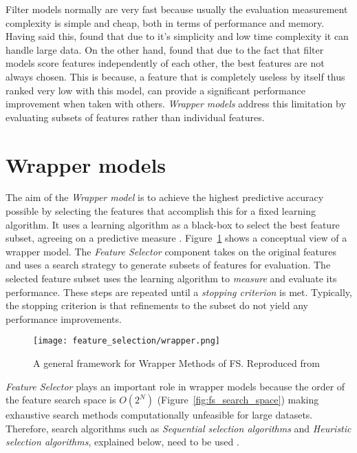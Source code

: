Filter models normally are very fast because usually the evaluation measurement complexity is simple and cheap, both in terms of performance and memory. Having said this, \citet{garcia2015data} found that due to it's simplicity and low time complexity it can handle large data. On the other hand, \citet{guyon2003introduction} found that due to the fact that filter models score features independently of each other, the best features are not always chosen. This is because, a feature that is completely useless by itself thus ranked very low with this model, can provide a significant performance improvement when taken with others. \textit{Wrapper models} address this limitation by evaluating subsets of features rather than individual features.

\section{Wrapper models}\label{sec:fs_wrapper}
The aim of the \textit{Wrapper model} is to achieve the highest predictive accuracy possible by selecting the features that accomplish this for a fixed learning algorithm. It uses a learning algorithm as a black-box to select the best feature subset, agreeing on a predictive measure \citep{kohavi1995study}. Figure~\ref{fig:fs_wrapper} shows a conceptual view of a wrapper model. The \textit{Feature Selector} component takes on the original features and uses a search strategy to generate subsets of features for evaluation. The selected feature subset uses the learning algorithm to \textit{measure} and evaluate its performance. These steps are repeated until a \textit{stopping criterion} is met. Typically, the stopping criterion is that refinements to the subset do not yield any performance improvements.

\begin{figure}
  \texttt{[image: feature\_selection/wrapper.png]}
  \caption{A general framework for Wrapper Methods of FS. Reproduced from \citet{tang2014feature}}
  \label{fig:fs_wrapper}
\end{figure}

\textit{Feature Selector} plays an important role in wrapper models because the order of the feature search space is $O(2^N)$ (Figure~\ref{fig:fs_search_space}) making exhaustive search methods computationally unfeasible for large datasets. Therefore, search algorithms such as \textit{Sequential selection algorithms} and \textit{Heuristic selection algorithms}, explained below, need to be used \citep{chandrashekar2014survey}.

